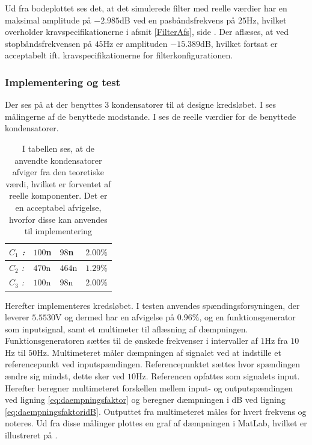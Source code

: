 \noindent Ud fra bodeplottet ses det, at det simulerede filter med reelle værdier har en maksimal amplitude på $-2.985$dB ved en pasbåndsfrekvens på $25$Hz, hvilket overholder kravspecifikationerne i afsnit \ref{FilterAfs}, side \pageref{FilterAfs}. Der aflæses, at ved stopbåndsfrekvensen på $45$Hz er amplituden $-15.389$dB, hvilket fortsat er acceptabelt ift. kravspecifikationerne for filterkonfigurationen. 

\subsubsection{Implementering og test} 
Der ses på  at der benyttes 3 kondensatorer til at designe kredsløbet. I  ses målingerne af de benyttede modstande. I  ses de reelle værdier for de benyttede kondensatorer.
\begin{table}[H]
	\centering
	\begin{tabular}{|l|l|l|l|}
		\hline
		\textit{$C_{1}$ :}                            & $100$n             & $98$n              & $2.00\%$           \\ \hline
		\textit{$C_{2}$ :}                            & $470$n             & $464$n             & $1.29\%$           \\ \hline 
		\textit{$C_{3}$ :}                            & $100$n             & $98$n              & $2.00\%$           \\ \hline
	\end{tabular}
	\caption{I tabellen ses, at de anvendte kondensatorer afviger fra den teoretiske værdi, hvilket er forventet af reelle komponenter. Det er en acceptabel afvigelse, hvorfor disse kan anvendes til implementering}
	\label{Tab:Maalingfilter}
\end{table}
\noindent Herefter implementeres kredsløbet. I testen anvendes spændingsforsyningen, der leverer $5.5530$V og dermed har en afvigelse på $0.96\%$, og en funktionsgenerator som inputsignal, samt et multimeter til aflæsning af dæmpningen. Funktionsgeneratoren sættes til de ønskede frekvenser i intervaller af $1$Hz fra $10$Hz til $50$Hz. Multimeteret måler dæmpningen af signalet ved at indstille et referencepunkt ved inputspændingen. Referencepunktet sættes hvor spændingen ændre sig mindst, dette sker ved $10$Hz. Referencen opfattes som signalets input. Herefter beregner multimeteret forskellen mellem input- og outputspændingen ved ligning \ref{eq:daempningsfaktor} og beregner dæmpningen i dB ved ligning \ref{eq:daempningsfaktoridB}. Outputtet fra multimeteret måles for hvert frekvens og noteres. Ud fra disse målinger plottes en graf af dæmpningen i MatLab, hvilket er illustreret på .  

